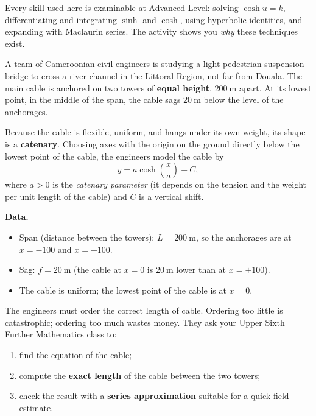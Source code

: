 \documentclass[11pt]{article}
\newcounter{popsec}
\newcounter{popsub}
\newcommand{\courssub}[1]{%
  \stepcounter{popsub}%
  \par\vspace{9pt}\noindent{\popxbold\fontsize{11.5}{13}\selectfont\color{popink}{\color{poporange}\thepopsec.\thepopsub}\hspace{6pt}#1}\par\nopagebreak\vspace{4pt}
}
\begin{document}
\begin{attention}
Every skill used here is examinable at Advanced Level: solving $\cosh u = k$, differentiating and integrating $\sinh$ and $\cosh$, using hyperbolic identities, and expanding with Maclaurin series. The activity shows you \emph{why} these techniques exist.
\end{attention}

\courssub{Situation}

\begin{experience}
A team of Cameroonian civil engineers is studying a light pedestrian suspension bridge to cross a river channel in the Littoral Region, not far from Douala. The main cable is anchored on two towers of \textbf{equal height}, $200\ \mathrm{m}$ apart. At its lowest point, in the middle of the span, the cable sags $20\ \mathrm{m}$ below the level of the anchorages.

Because the cable is flexible, uniform, and hangs under its own weight, its shape is a \textbf{catenary}. Choosing axes with the origin on the ground directly below the lowest point of the cable, the engineers model the cable by
\[ y = a\cosh\!\left(\frac{x}{a}\right) + C, \]
where $a > 0$ is the \emph{catenary parameter} (it depends on the tension and the weight per unit length of the cable) and $C$ is a vertical shift.

\textbf{Data.}
\begin{itemize}
\item Span (distance between the towers): $L = 200\ \mathrm{m}$, so the anchorages are at $x = -100$ and $x = +100$.
\item Sag: $f = 20\ \mathrm{m}$ (the cable at $x = 0$ is $20\ \mathrm{m}$ lower than at $x = \pm 100$).
\item The cable is uniform; the lowest point of the cable is at $x = 0$.
\end{itemize}

The engineers must order the correct length of cable. Ordering too little is catastrophic; ordering too much wastes money. They ask your Upper Sixth Further Mathematics class to:
\begin{enumerate}
\item find the equation of the cable;
\item compute the \textbf{exact length} of the cable between the two towers;
\item check the result with a \textbf{series approximation} suitable for a quick field estimate.
\end{enumerate}
\end{experience}
\end{document}

